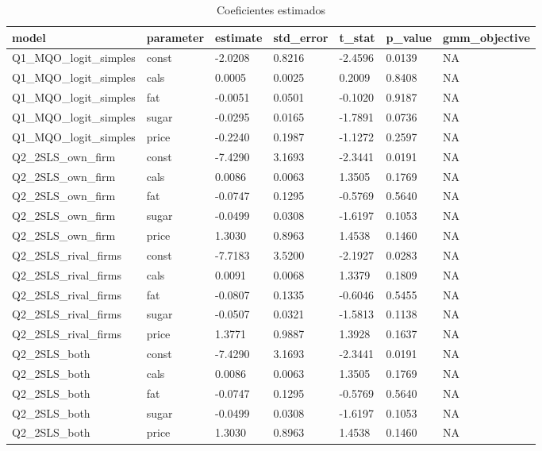 \begin{table}[!htbp]
\centering
\caption{Coeficientes estimados}
\label{tab:all-coef}
\scriptsize
\begin{tabular}{lllllll}
\hline
model & parameter & estimate & std\_error & t\_stat & p\_value & gmm\_objective
\\
\hline
Q1\_MQO\_logit\_simples & const & -2.0208 & 0.8216 & -2.4596 & 0.0139 & NA
\\
Q1\_MQO\_logit\_simples & cals & 0.0005 & 0.0025 & 0.2009 & 0.8408 & NA
\\
Q1\_MQO\_logit\_simples & fat & -0.0051 & 0.0501 & -0.1020 & 0.9187 & NA
\\
Q1\_MQO\_logit\_simples & sugar & -0.0295 & 0.0165 & -1.7891 & 0.0736 & NA
\\
Q1\_MQO\_logit\_simples & price & -0.2240 & 0.1987 & -1.1272 & 0.2597 & NA
\\
Q2\_2SLS\_own\_firm & const & -7.4290 & 3.1693 & -2.3441 & 0.0191 & NA
\\
Q2\_2SLS\_own\_firm & cals & 0.0086 & 0.0063 & 1.3505 & 0.1769 & NA
\\
Q2\_2SLS\_own\_firm & fat & -0.0747 & 0.1295 & -0.5769 & 0.5640 & NA
\\
Q2\_2SLS\_own\_firm & sugar & -0.0499 & 0.0308 & -1.6197 & 0.1053 & NA
\\
Q2\_2SLS\_own\_firm & price & 1.3030 & 0.8963 & 1.4538 & 0.1460 & NA
\\
Q2\_2SLS\_rival\_firms & const & -7.7183 & 3.5200 & -2.1927 & 0.0283 & NA
\\
Q2\_2SLS\_rival\_firms & cals & 0.0091 & 0.0068 & 1.3379 & 0.1809 & NA
\\
Q2\_2SLS\_rival\_firms & fat & -0.0807 & 0.1335 & -0.6046 & 0.5455 & NA
\\
Q2\_2SLS\_rival\_firms & sugar & -0.0507 & 0.0321 & -1.5813 & 0.1138 & NA
\\
Q2\_2SLS\_rival\_firms & price & 1.3771 & 0.9887 & 1.3928 & 0.1637 & NA
\\
Q2\_2SLS\_both & const & -7.4290 & 3.1693 & -2.3441 & 0.0191 & NA
\\
Q2\_2SLS\_both & cals & 0.0086 & 0.0063 & 1.3505 & 0.1769 & NA
\\
Q2\_2SLS\_both & fat & -0.0747 & 0.1295 & -0.5769 & 0.5640 & NA
\\
Q2\_2SLS\_both & sugar & -0.0499 & 0.0308 & -1.6197 & 0.1053 & NA
\\
Q2\_2SLS\_both & price & 1.3030 & 0.8963 & 1.4538 & 0.1460 & NA
\\

\end{tabular}
\end{table}
